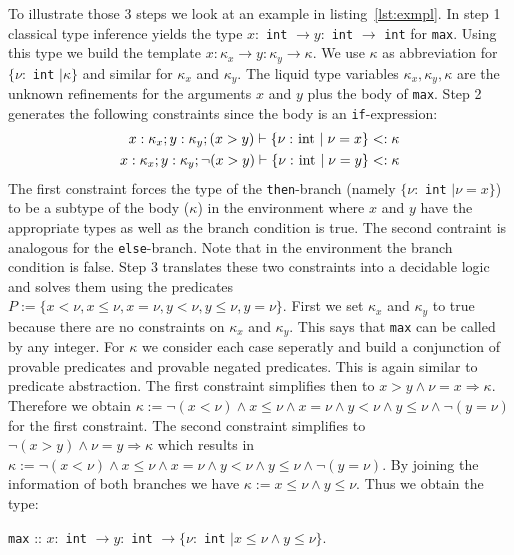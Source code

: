 \documentclass[a4paper,UKenglish]{lipics-v2016}
\begin{document}
To illustrate those 3 steps we look at an example in listing~\ref{lst:exmpl}.
In step 1 classical type inference yields the type $x:$ \lstinline{int} $\rightarrow y:$ \lstinline{int} $\rightarrow$ \lstinline{int} for \lstinline{max}.
Using this type we build the template $x: \kappa_x \rightarrow y: \kappa_y \rightarrow \kappa$.
We use $\kappa$ as abbreviation for $\{ \nu:$ \lstinline{int} $\mid \kappa\}$ and similar for $\kappa_x$ and $\kappa_y$.
The liquid type variables $\kappa_x, \kappa_y, \kappa$ are the unknown refinements for the arguments $x$ and $y$ plus the body of \lstinline{max}.
Step 2 generates the following constraints since the body is an \lstinline{if}-expression:
\begin{align}
    \label{algn:max}
    x: \kappa_x; y: \kappa_y; (x > y) \vdash \{\nu: \text{\lstinline|int|} \mid \nu = x \} <: \kappa\\
    x: \kappa_x; y: \kappa_y; \neg(x > y) \vdash \{\nu: \text{\lstinline|int|} \mid \nu = y \} <: \kappa
\end{align}
The first constraint forces the type of the \lstinline{then}-branch (namely $\{\nu:$ \lstinline{int} $\mid \nu = x \}$) to be a subtype
of the body ($\kappa$) in the environment where $x$ and $y$ have the appropriate types as well as the branch condition is true.
The second contraint is analogous for the \lstinline{else}-branch.
Note that in the environment the branch condition is false.
Step 3 translates these two constraints into a decidable logic and solves them using the predicates $P := \{x < \nu, x \le \nu, x = \nu, y < \nu, y \le \nu, y = \nu\}$.
First we set $\kappa_x$ and $\kappa_y$ to true because there are no constraints on $\kappa_x$ and $\kappa_y$.
This says that \lstinline{max} can be called by any integer.
For $\kappa$ we consider each case seperatly and build a conjunction of provable predicates and provable negated predicates.
This is again similar to predicate abstraction.
The first constraint simplifies then to $x > y \land \nu = x \Rightarrow \kappa$.
Therefore we obtain $\kappa := \neg(x < \nu) \land x \le \nu \land x = \nu \land y < \nu \land y \le \nu \land \neg(y = \nu)$ for the first constraint.
The second constraint simplifies to $\neg(x > y) \land \nu = y \Rightarrow \kappa$
which results in $\kappa := \neg(x < \nu) \land x \le \nu \land x = \nu \land y < \nu \land y \le \nu \land \neg(y = \nu)$.
By joining the information of both branches we have $\kappa := x \le \nu \land y \le \nu$.
Thus we obtain the type:
\begin{center}
    \lstinline{max} :: $x:$ \lstinline{int} $\rightarrow y:$ \lstinline{int} $\rightarrow \{\nu:$ \lstinline{int} $\mid x \le \nu \land y \le \nu\}$.
\end{center}
\end{document}
